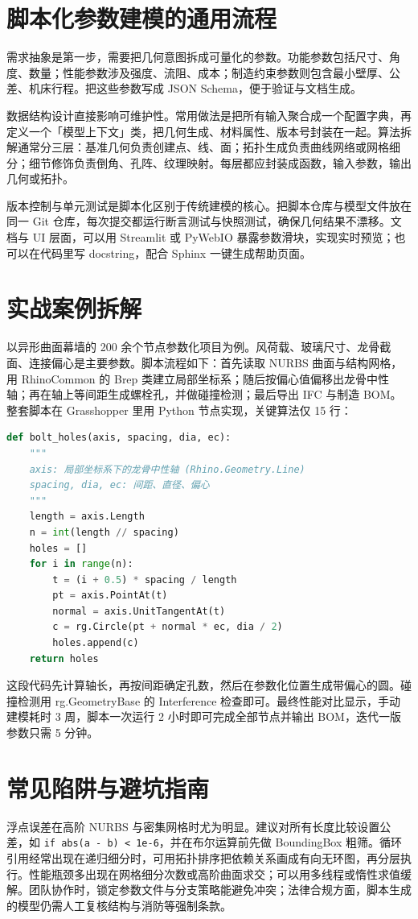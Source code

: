 \chapter{脚本化参数建模的通用流程}
需求抽象是第一步，需要把几何意图拆成可量化的参数。功能参数包括尺寸、角度、数量；性能参数涉及强度、流阻、成本；制造约束参数则包含最小壁厚、公差、机床行程。把这些参数写成 JSON Schema，便于验证与文档生成。\par
数据结构设计直接影响可维护性。常用做法是把所有输入聚合成一个配置字典，再定义一个「模型上下文」类，把几何生成、材料属性、版本号封装在一起。算法拆解通常分三层：基准几何负责创建点、线、面；拓扑生成负责曲线网络或网格细分；细节修饰负责倒角、孔阵、纹理映射。每层都应封装成函数，输入参数，输出几何或拓扑。\par
版本控制与单元测试是脚本化区别于传统建模的核心。把脚本仓库与模型文件放在同一 Git 仓库，每次提交都运行断言测试与快照测试，确保几何结果不漂移。文档与 UI 层面，可以用 Streamlit 或 PyWebIO 暴露参数滑块，实现实时预览；也可以在代码里写 docstring，配合 Sphinx 一键生成帮助页面。\par
\chapter{实战案例拆解}
以异形曲面幕墙的 200 余个节点参数化项目为例。风荷载、玻璃尺寸、龙骨截面、连接偏心是主要参数。脚本流程如下：首先读取 NURBS 曲面与结构网格，用 RhinoCommon 的 Brep 类建立局部坐标系；随后按偏心值偏移出龙骨中性轴；再在轴上等间距生成螺栓孔，并做碰撞检测；最后导出 IFC 与制造 BOM。整套脚本在 Grasshopper 里用 Python 节点实现，关键算法仅 15 行：\par
\begin{lstlisting}[language=python]
def bolt_holes(axis, spacing, dia, ec):
    """
    axis: 局部坐标系下的龙骨中性轴 (Rhino.Geometry.Line)
    spacing, dia, ec: 间距、直径、偏心
    """
    length = axis.Length
    n = int(length // spacing)
    holes = []
    for i in range(n):
        t = (i + 0.5) * spacing / length
        pt = axis.PointAt(t)
        normal = axis.UnitTangentAt(t)
        c = rg.Circle(pt + normal * ec, dia / 2)
        holes.append(c)
    return holes
\end{lstlisting}
这段代码先计算轴长，再按间距确定孔数，然后在参数化位置生成带偏心的圆。碰撞检测用 rg.GeometryBase 的 Interference 检查即可。最终性能对比显示，手动建模耗时 3 周，脚本一次运行 2 小时即可完成全部节点并输出 BOM，迭代一版参数只需 5 分钟。\par
\chapter{常见陷阱与避坑指南}
浮点误差在高阶 NURBS 与密集网格时尤为明显。建议对所有长度比较设置公差，如 \texttt{if abs(a - b) < 1e-6}，并在布尔运算前先做 BoundingBox 粗筛。循环引用经常出现在递归细分时，可用拓扑排序把依赖关系画成有向无环图，再分层执行。性能瓶颈多出现在网格细分次数或高阶曲面求交；可以用多线程或惰性求值缓解。团队协作时，锁定参数文件与分支策略能避免冲突；法律合规方面，脚本生成的模型仍需人工复核结构与消防等强制条款。\par
